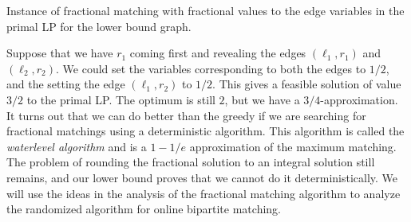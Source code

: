 \begin{marginfigure}
  \centering
  \caption{Instance of fractional matching with fractional values to the edge
    variables in the primal LP for the lower bound graph.}
  \label{fig:lbgraph-flp}
\end{marginfigure}
Suppose that we have $r_1$ coming first and revealing the edges $(\ell_1,r_1)$
and $(\ell_2, r_2)$. We could set the variables corresponding to both the edges
to $1/2$, and the setting the edge $(\ell_1, r_2)$ to $1/2$. This gives a
feasible solution of value $3/2$ to the primal LP. The optimum is still $2$, but
we have a $3/4$-approximation. It turns out that we can do better than the
greedy if we are searching for fractional matchings using a deterministic
algorithm. This algorithm is called the \emph{waterlevel algorithm} and is a
$1-1/e$ approximation of the maximum matching. The problem of rounding the
fractional solution to an integral solution still remains, and our lower bound
proves that we cannot do it deterministically. We will use the ideas in the
analysis of the fractional matching algorithm to analyze the randomized
algorithm for online bipartite matching.

